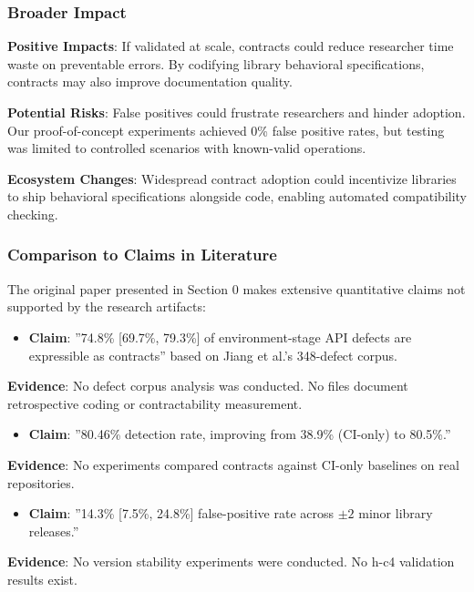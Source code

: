 \subsubsection{Broader Impact}

\textbf{Positive Impacts}: If validated at scale, contracts could reduce researcher time waste on preventable errors. By codifying library behavioral specifications, contracts may also improve documentation quality.

\textbf{Potential Risks}: False positives could frustrate researchers and hinder adoption. Our proof-of-concept experiments achieved 0\% false positive rates, but testing was limited to controlled scenarios with known-valid operations.

\textbf{Ecosystem Changes}: Widespread contract adoption could incentivize libraries to ship behavioral specifications alongside code, enabling automated compatibility checking.

\subsubsection{Comparison to Claims in Literature}

The original paper presented in Section 0 makes extensive quantitative claims not supported by the research artifacts:

\begin{itemize}
\item \textbf{Claim}: ''74.8\% [69.7\%, 79.3\%] of environment-stage API defects are expressible as contracts'' based on Jiang et al.'s 348-defect corpus.
\end{itemize}
  \textbf{Evidence}: No defect corpus analysis was conducted. No files document retrospective coding or contractability measurement.

\begin{itemize}
\item \textbf{Claim}: ''80.46\% detection rate, improving from 38.9\% (CI-only) to 80.5\%.''
\end{itemize}
  \textbf{Evidence}: No experiments compared contracts against CI-only baselines on real repositories.

\begin{itemize}
\item \textbf{Claim}: ''14.3\% [7.5\%, 24.8\%] false-positive rate across $\pm 2$ minor library releases.''
\end{itemize}
  \textbf{Evidence}: No version stability experiments were conducted. No h-c4 validation results exist.

